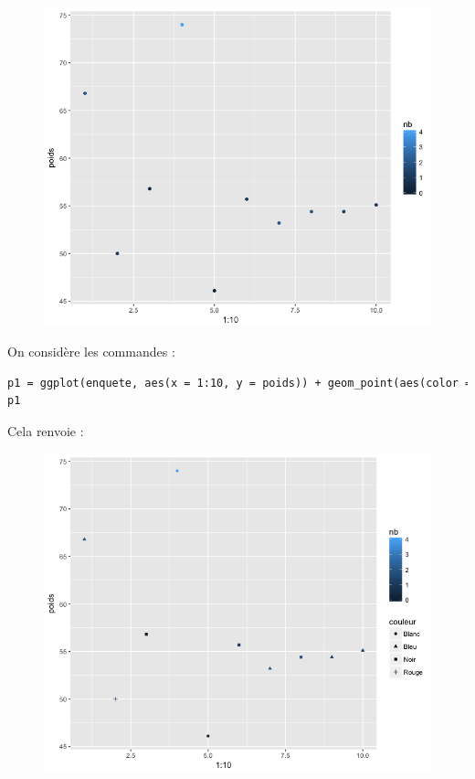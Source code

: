 \begin{figure}[H]\begin{center}\includegraphics[scale=0.4]{ilu/gra72.png}\end{center}\end{figure}
On considère les commandes :
\begin{lstlisting}[language=html]
p1 = ggplot(enquete, aes(x = 1:10, y = poids)) + geom_point(aes(color = nb, shape = couleur))
p1
\end{lstlisting}
Cela renvoie :
\begin{figure}[H]\begin{center}\includegraphics[scale=0.4]{ilu/gra73.png}\end{center}\end{figure}
